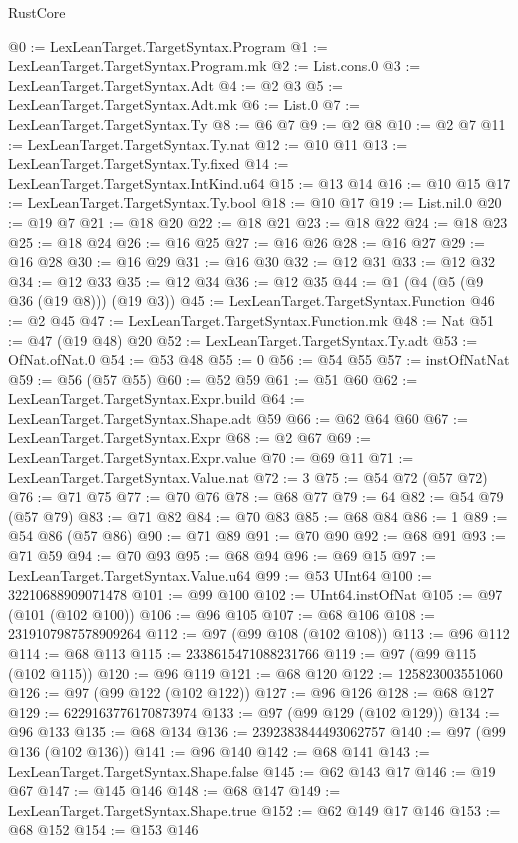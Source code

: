\begin{lexlean}{RustCore}
\begin{coremodule}
@0 := LexLeanTarget.TargetSyntax.Program
@1 := LexLeanTarget.TargetSyntax.Program.mk
@2 := List.cons.{0}
@3 := LexLeanTarget.TargetSyntax.Adt
@4 := @2 @3
@5 := LexLeanTarget.TargetSyntax.Adt.mk
@6 := List.{0}
@7 := LexLeanTarget.TargetSyntax.Ty
@8 := @6 @7
@9 := @2 @8
@10 := @2 @7
@11 := LexLeanTarget.TargetSyntax.Ty.nat
@12 := @10 @11
@13 := LexLeanTarget.TargetSyntax.Ty.fixed
@14 := LexLeanTarget.TargetSyntax.IntKind.u64
@15 := @13 @14
@16 := @10 @15
@17 := LexLeanTarget.TargetSyntax.Ty.bool
@18 := @10 @17
@19 := List.nil.{0}
@20 := @19 @7
@21 := @18 @20
@22 := @18 @21
@23 := @18 @22
@24 := @18 @23
@25 := @18 @24
@26 := @16 @25
@27 := @16 @26
@28 := @16 @27
@29 := @16 @28
@30 := @16 @29
@31 := @16 @30
@32 := @12 @31
@33 := @12 @32
@34 := @12 @33
@35 := @12 @34
@36 := @12 @35
@44 := @1 (@4 (@5 (@9 @36 (@19 @8))) (@19 @3))
@45 := LexLeanTarget.TargetSyntax.Function
@46 := @2 @45
@47 := LexLeanTarget.TargetSyntax.Function.mk
@48 := Nat
@51 := @47 (@19 @48) @20
@52 := LexLeanTarget.TargetSyntax.Ty.adt
@53 := OfNat.ofNat.{0}
@54 := @53 @48
@55 := 0
@56 := @54 @55
@57 := instOfNatNat
@59 := @56 (@57 @55)
@60 := @52 @59
@61 := @51 @60
@62 := LexLeanTarget.TargetSyntax.Expr.build
@64 := LexLeanTarget.TargetSyntax.Shape.adt @59
@66 := @62 @64 @60
@67 := LexLeanTarget.TargetSyntax.Expr
@68 := @2 @67
@69 := LexLeanTarget.TargetSyntax.Expr.value
@70 := @69 @11
@71 := LexLeanTarget.TargetSyntax.Value.nat
@72 := 3
@75 := @54 @72 (@57 @72)
@76 := @71 @75
@77 := @70 @76
@78 := @68 @77
@79 := 64
@82 := @54 @79 (@57 @79)
@83 := @71 @82
@84 := @70 @83
@85 := @68 @84
@86 := 1
@89 := @54 @86 (@57 @86)
@90 := @71 @89
@91 := @70 @90
@92 := @68 @91
@93 := @71 @59
@94 := @70 @93
@95 := @68 @94
@96 := @69 @15
@97 := LexLeanTarget.TargetSyntax.Value.u64
@99 := @53 UInt64
@100 := 32210688909071478
@101 := @99 @100
@102 := UInt64.instOfNat
@105 := @97 (@101 (@102 @100))
@106 := @96 @105
@107 := @68 @106
@108 := 2319107987578909264
@112 := @97 (@99 @108 (@102 @108))
@113 := @96 @112
@114 := @68 @113
@115 := 2338615471088231766
@119 := @97 (@99 @115 (@102 @115))
@120 := @96 @119
@121 := @68 @120
@122 := 125823003551060
@126 := @97 (@99 @122 (@102 @122))
@127 := @96 @126
@128 := @68 @127
@129 := 6229163776170873974
@133 := @97 (@99 @129 (@102 @129))
@134 := @96 @133
@135 := @68 @134
@136 := 2392383844493062757
@140 := @97 (@99 @136 (@102 @136))
@141 := @96 @140
@142 := @68 @141
@143 := LexLeanTarget.TargetSyntax.Shape.false
@145 := @62 @143 @17
@146 := @19 @67
@147 := @145 @146
@148 := @68 @147
@149 := LexLeanTarget.TargetSyntax.Shape.true
@152 := @62 @149 @17 @146
@153 := @68 @152
@154 := @153 @146

\end{coremodule}
\end{lexlean}
